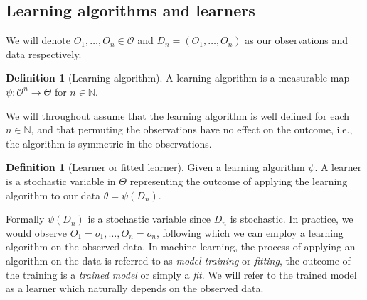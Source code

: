 \documentclass[11pt, a4paper]{article}
\theoremstyle{definition}
\newtheorem{definition}[theorem]{Definition}
\theoremstyle{remark}
\newcommand{\btheta}{\theta}
\newcommand{\la}{\psi}
\begin{document}
\subsection{Learning algorithms and learners}
We will denote $ O_1 , \dots , O_n \in \mathcal{O} $ and $ D_n = (O_1 , \dots , O_n) $ as our observations and data respectively. 
\begin{definition}[Learning algorithm]
    A learning algorithm is a measurable map $ \la : \mathcal{O}^{n} \to \Theta $ for $ n \in \mathbb{N} $. 
\end{definition}
We will throughout assume that the learning algorithm is well defined for each $ n \in \mathbb{N} $, and that permuting the observations have no effect on the outcome, i.e., the algorithm is symmetric in the observations.  
\begin{definition}[Learner or fitted learner]
    Given a learning algorithm $ \la $. A learner is a stochastic variable in $ \Theta $ representing the outcome of applying the learning algorithm to our data $ \btheta = \la(D_n) $.
\end{definition}
Formally $ \la(D_n) $ is a stochastic variable since $ D_n $ is stochastic. In practice, we would observe $ O_1 = o_1, \dots, O_n = o_n $, following which we can employ a learning algorithm on the observed data. In machine learning, the process of applying an algorithm on the data is referred to as \textit{model training} or \textit{fitting}, the outcome of the training is a \textit{trained model} or simply a \textit{fit}. We will refer to the trained model as a learner which naturally depends on the observed data. 
\end{document}
